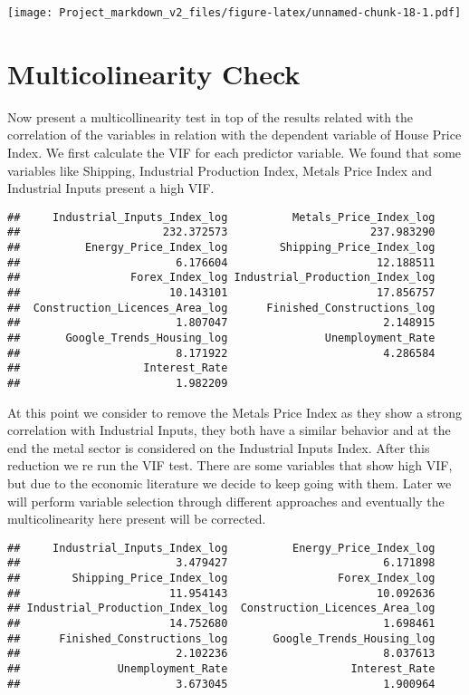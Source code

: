 \documentclass[
]{article}
\begin{document}
\texttt{[image: Project\_markdown\_v2\_files/figure-latex/unnamed-chunk-18-1.pdf]}

\section{Multicolinearity Check}\label{multicolinearity-check}

Now present a multicollinearity test in top of the results related with
the correlation of the variables in relation with the dependent variable
of House Price Index. We first calculate the VIF for each predictor
variable. We found that some variables like Shipping, Industrial
Production Index, Metals Price Index and Industrial Inputs present a
high VIF.

\begin{verbatim}
##     Industrial_Inputs_Index_log          Metals_Price_Index_log 
##                      232.372573                      237.983290 
##          Energy_Price_Index_log        Shipping_Price_Index_log 
##                        6.176604                       12.188511 
##                 Forex_Index_log Industrial_Production_Index_log 
##                       10.143101                       17.856757 
##  Construction_Licences_Area_log      Finished_Constructions_log 
##                        1.807047                        2.148915 
##       Google_Trends_Housing_log               Unemployment_Rate 
##                        8.171922                        4.286584 
##                   Interest_Rate 
##                        1.982209
\end{verbatim}

At this point we consider to remove the Metals Price Index as they show
a strong correlation with Industrial Inputs, they both have a similar
behavior and at the end the metal sector is considered on the Industrial
Inputs Index. After this reduction we re run the VIF test. There are
some variables that show high VIF, but due to the economic literature we
decide to keep going with them. Later we will perform variable selection
through different approaches and eventually the multicolinearity here
present will be corrected.

\begin{verbatim}
##     Industrial_Inputs_Index_log          Energy_Price_Index_log 
##                        3.479427                        6.171898 
##        Shipping_Price_Index_log                 Forex_Index_log 
##                       11.954143                       10.092636 
## Industrial_Production_Index_log  Construction_Licences_Area_log 
##                       14.752680                        1.698461 
##      Finished_Constructions_log       Google_Trends_Housing_log 
##                        2.102236                        8.037613 
##               Unemployment_Rate                   Interest_Rate 
##                        3.673045                        1.900964
\end{verbatim}
\end{document}
